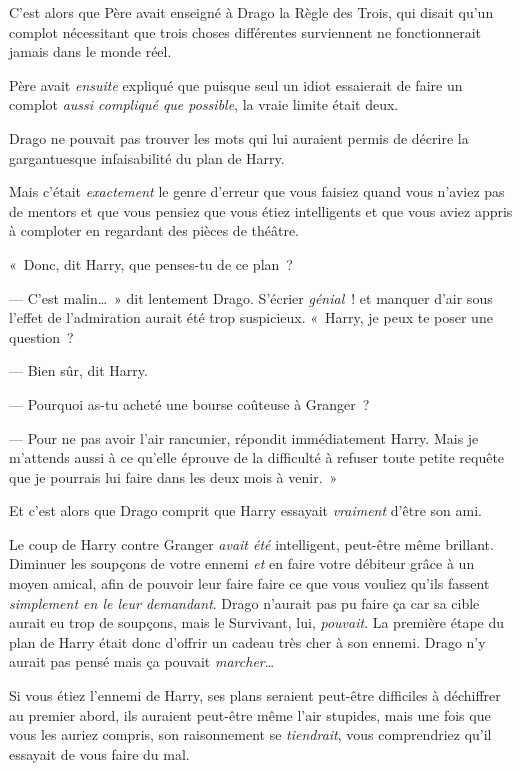 C'est alors que Père avait enseigné à Drago la Règle des Trois, qui disait qu'un complot nécessitant que trois choses différentes surviennent ne fonctionnerait jamais dans le monde réel.

Père avait \emph{ensuite} expliqué que puisque seul un idiot essaierait de faire un complot \emph{aussi compliqué que possible}, la vraie limite était deux.

Drago ne pouvait pas trouver les mots qui lui auraient permis de décrire la gargantuesque infaisabilité du plan de Harry.

Mais c'était \emph{exactement} le genre d'erreur que vous faisiez quand vous n'aviez pas de mentors et que vous pensiez que vous étiez intelligents et que vous aviez appris à comploter en regardant des pièces de théâtre.

«~Donc, dit Harry, que penses-tu de ce plan~?

--- C'est malin…~» dit lentement Drago. S'écrier \emph{génial}~! et manquer d'air sous l'effet de l'admiration aurait été trop suspicieux. «~Harry, je peux te poser une question~?

--- Bien sûr, dit Harry.

--- Pourquoi as-tu acheté une bourse coûteuse à Granger~?

--- Pour ne pas avoir l'air rancunier, répondit immédiatement Harry. Mais je m'attends aussi à ce qu'elle éprouve de la difficulté à refuser toute petite requête que je pourrais lui faire dans les deux mois à venir.~»

Et c'est alors que Drago comprit que Harry essayait \emph{vraiment} d'être son ami.

Le coup de Harry contre Granger \emph{avait été} intelligent, peut-être même brillant. Diminuer les soupçons de votre ennemi \emph{et} en faire votre débiteur grâce à un moyen amical, afin de pouvoir leur faire faire ce que vous vouliez qu'ils fassent \emph{simplement en le leur demandant}. Drago n'aurait pas pu faire ça car sa cible aurait eu trop de soupçons, mais le Survivant, lui, \emph{pouvait}. La première étape du plan de Harry était donc d'offrir un cadeau très cher à son ennemi. Drago n'y aurait pas pensé mais ça pouvait \emph{marcher}…

Si vous étiez l'ennemi de Harry, ses plans seraient peut-être difficiles à déchiffrer au premier abord, ils auraient peut-être même l'air stupides, mais une fois que vous les auriez compris, son raisonnement se \emph{tiendrait}, vous comprendriez qu'il essayait de vous faire du mal.

